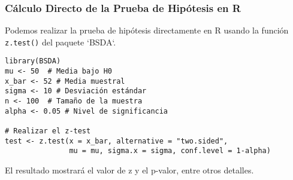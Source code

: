 \documentclass[aspectratio=169]{beamer}
\begin{document}
\begin{frame}[fragile]
\frametitle{Cálculo Directo de la Prueba de Hipótesis en R}
Podemos realizar la prueba de hipótesis directamente en R usando la función \texttt{z.test()} del paquete `BSDA`.

\begin{verbatim}
library(BSDA)
mu <- 50  # Media bajo H0
x_bar <- 52 # Media muestral
sigma <- 10 # Desviación estándar
n <- 100  # Tamaño de la muestra
alpha <- 0.05 # Nivel de significancia

# Realizar el z-test
test <- z.test(x = x_bar, alternative = "two.sided", 
               mu = mu, sigma.x = sigma, conf.level = 1-alpha)
\end{verbatim}

El resultado mostrará el valor de z y el p-valor, entre otros detalles.
\end{frame}
\end{document}
